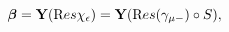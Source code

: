 \begin{equation}
\boldsymbol\beta={\bf Y}({\text Res}\chi_{\epsilon})={\bf Y}({\text Res}(\gamma_{\mu -})\circ S),\label{zz.2}
\end{equation}

